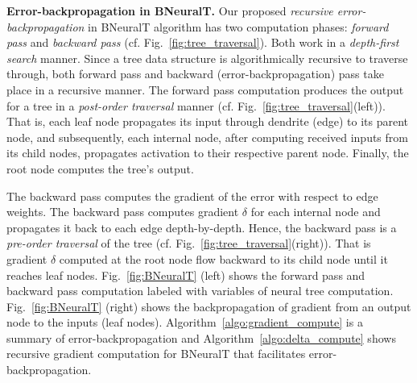 \documentclass[11pt,a4paper]{article}
\begin{document}
    \textbf{Error-backpropagation in BNeuralT.}
    Our proposed \textit{recursive error-backpropagation} in BNeuralT algorithm has two computation phases: \textit{forward pass} and \textit{backward pass} (cf. Fig.~\ref{fig:tree_traversal}). Both work in a \textit{depth-first search} manner. Since a tree data structure is algorithmically recursive to traverse through, both forward pass and backward (error-backpropagation) pass take place in a recursive manner. The forward pass computation produces the output for a tree in a \textit{post-order traversal} manner (cf. Fig.~\ref{fig:tree_traversal}(left)). That is, each leaf node propagates its input through dendrite (edge) to its parent node, and subsequently, each internal node, after computing received inputs from its child nodes, propagates activation to their respective parent node. Finally, the root node computes the tree's output.
    
    The backward pass computes the gradient of the error with respect to edge weights. The backward pass computes gradient $ \delta $ for each internal node and propagates it back to each edge depth-by-depth. Hence, the backward pass is a \textit{pre-order traversal} of the tree (cf. Fig.~\ref{fig:tree_traversal}(right)). That is gradient $ \delta $ computed at the root node flow backward to its child node until it reaches leaf nodes.
    Fig.~\ref{fig:BNeuralT} (left) shows the forward pass and backward pass computation labeled with variables of neural tree computation. Fig.~\ref{fig:BNeuralT} (right) shows the backpropagation of gradient from an output node to the inputs (leaf nodes). Algorithm~\ref{algo:gradient_compute} is a summary of error-backpropagation and Algorithm~\ref{algo:delta_compute} shows recursive gradient computation for BNeuralT that facilitates error-backpropagation.
    
\end{document}
